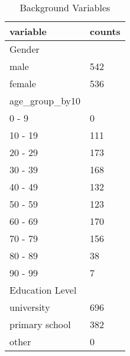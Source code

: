 \documentclass{article}
\begin{document}
\begin{table}[h]
\centering
\caption{Background Variables}
\label{table:value_counts}
\begin{tabular}{ll}
\hline
variable                                                                           & counts \\ \hline
Gender                                                                      &        \\
male                                                                             & 542    \\
female                                                                             & 536    \\ \hline
age\_group\_by10                                                                &        \\
0 - 9                                                                           & 0      \\ 
10 - 19                                                                         & 111    \\
20 - 29                                                                         & 173    \\
30 - 39                                                                         & 168    \\
40 - 49                                                                         & 132    \\
50 - 59                                                                         & 123    \\
60 - 69                                                                         & 170    \\
70 - 79                                                                         & 156    \\
80 - 89                                                                         & 38     \\
90 - 99                                                                         & 7      \\ \hline
Education Level                                                                  &        \\
university                                                                      & 696    \\
primary school                                                                  & 382    \\
other                                                                           & 0      \\\hline

\end{tabular}
\end{table}
\end{document}
